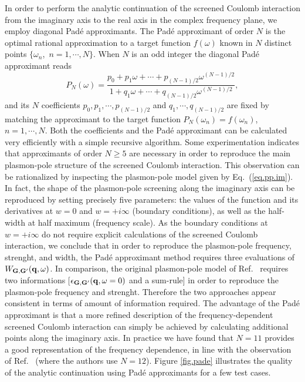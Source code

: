 \documentclass[twocolumn,prb,showpacs,superscriptaddress]{revtex4}
\def\w{\omega}
\def\q{{\bf q}}
\def\G{{\bf G}}
\def\Gp{{\bf G^\prime}}
\begin{document}
In order to perform the analytic continuation of the screened Coulomb interaction
from the imaginary axis to the real axis in the complex frequency plane, we employ diagonal 
Pad\'e approximants.\cite{pade1,pade2,blochl}
The Pad\'e approximant of order $N$ is the optimal rational approximation
to a target function $f(\w)$ known in $N$ distinct points 
$\{\w_n$,~$n=1,\cdots,N\}$. 
When $N$ is an odd integer the diagonal Pad\'e approximant reads
  \begin{equation}
  P_N(\w) = \frac{p_0+p_1\w+\cdots+p_{(N-1)/2}\w^{(N-1)/2}}
  {1+q_1\w+\cdots+q_{(N-1)/2}\w^{(N-1)/2}},
  \end{equation}
and its $N$ coefficients $p_0, p_1, \cdots, p_{(N-1)/2}$ and 
$q_1, \cdots, q_{(N-1)/2}$ are fixed by matching the approximant
to the target function $P_N(\w_n)=f(\w_n)$,~$n=1,\cdots,N$.
Both the coefficients and the Pad\'e approximant can be calculated
very efficiently with a simple recursive algorithm.\cite{pade2}
Some experimentation indicates that approximants of order $N\ge5$ are necessary
in order to reproduce the main plasmon-pole structure of the screened 
Coulomb interaction.
This observation can be rationalized by inspecting the plasmon-pole
model given by Eq.\ (\ref{eq.pp.im}). In fact, the shape of the plasmon-pole
screening along the imaginary axis can be reproduced by setting precisely
five parameters: the values of the function and its derivatives at $w=0$ and $w=+i\infty$
(boundary conditions), as well as the half-width at half maximum (frequency scale).
As the boundary conditions at $w=+i\infty$ do not require explicit calculations
of the screened Coulomb interaction, we conclude that in order to reproduce
the plasmon-pole frequency, strenght, and width, the Pad\'e approximant
method requires three evaluations of $W_{\G,\Gp}(\q,\w)$. In comparison, the original
plasmon-pole model of Ref.\  requires two informations
[$\epsilon_{\G,\Gp}(\q,\w=0)$ and a sum-rule] in order to reproduce the plasmon-pole 
frequency and strenght. Therefore the two approaches appear consistent
in terms of amount of information required.
The advantage of the Pad\'e approximant is that a more refined description
of the frequency-dependent screened Coulomb interaction can simply be achieved
by calculating additional points along the imaginary axis. In practice
we have found that $N=11$ provides a good representation of the frequency
dependence, in line with the observation of Ref.\ 
(where the authors use $N=12$). Figure \ref{fig.pade} illustrates the quality
of the analytic continuation using Pad\'e approximants for a few test cases.
\end{document}
